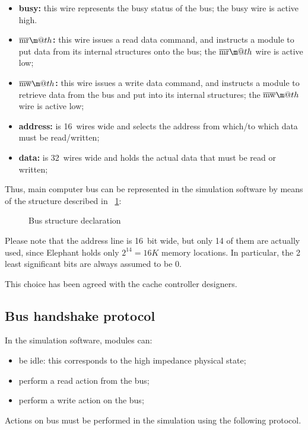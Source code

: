 \documentclass[a4paper,12pt]{article}
\makeatletter
\newcommand*{\textoverline}[1]{$\overline{\hbox{#1}}\m@th$}
\newcommand{\memoryname}{Elephant}
\makeatother
\begin{document}
\begin{itemize}
  \item \textbf{busy:} this wire represents the busy status of the bus; the busy wire is active high.
  \item \textbf{\textoverline{mr}:} this wire issues a read data command, and instructs a module to put data from its internal structures onto the bus; the \textoverline{mr} wire is active low;
  \item \textbf{\textoverline{mw}:} this wire issues a write data command, and instructs a module to retrieve data from the bus and put into its internal structures; the \textoverline{mw} wire is active low;
  \item \textbf{address:} is 16~wires wide and selects the address from which/to which data must be read/written;
  \item \textbf{data:} is 32~wires wide and holds the actual data that must be read or written;
\end{itemize}

Thus, main computer bus can be represented in the simulation software by means of the structure described in \figurename~\ref{src:bus-h}:

\begin{figure}

\caption{Bus structure declaration}
\label{src:bus-h}
\end{figure}

Please note that the address line is 16~bit wide, but only 14 of them are actually used, since \memoryname{} holds only $2^{14} = 16K$ memory locations.
In particular, the 2 least significant bits are always assumed to be 0.

This choice has been agreed with the cache controller designers.

\subsection{Bus handshake protocol}
In the simulation software, modules can:
\begin{itemize}
  \item be idle: this corresponds to the high impedance physical state;
  \item perform a read action from the bus;
  \item perform a write action on the bus;
\end{itemize}

Actions on bus must be performed in the simulation using the following protocol.
\end{document}
